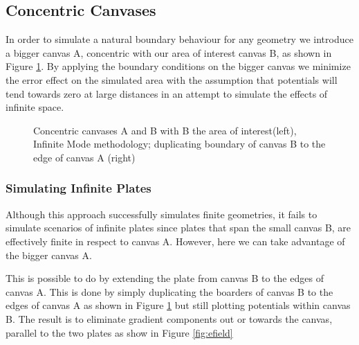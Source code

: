 \documentclass[a4paper]{article}
\begin{document}
\subsection{Concentric Canvases}
In order to simulate a natural boundary behaviour for any geometry we introduce 
a bigger canvas A, concentric with our area of interest canvas B, as shown in 
Figure \ref{fig:canv}. By applying the boundary conditions on the bigger canvas 
we minimize the error effect on the simulated area with the assumption that 
potentials will tend towards zero at large distances in an attempt to simulate the effects of infinite space. \\

\begin{figure}[!h]
  \centering
  
  \hfill
  \caption{Concentric canvases A and B with B the area of interest(left), 
Infinite Mode methodology; duplicating boundary of canvas B to the edge of 
canvas A (right)}
\label{fig:canv}
\end{figure}

\subsubsection{Simulating Infinite Plates}
Although this approach successfully simulates finite geometries, it fails to 
simulate scenarios of infinite plates since plates that span the small canvas 
B, are effectively finite in respect to canvas A. However, here we can take 
advantage of the bigger canvas A.

This is possible to do by extending the plate from canvas B to the edges 
of canvas A. This is done by simply duplicating the boarders of canvas B to the 
edges of canvas A as shown in Figure \ref{fig:canv} but still plotting 
potentials within canvas B. The result is to eliminate gradient components out 
or towards the canvas, parallel to the two plates as show in Figure 
\ref{fig:efield}
\end{document}
